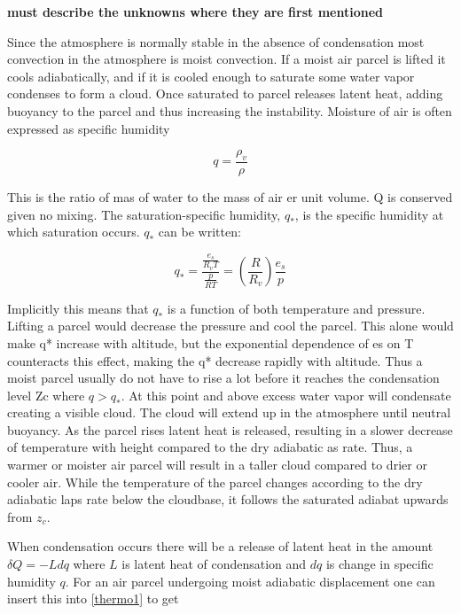 \textbf{must describe the unknowns where they are first mentioned}


Since the atmosphere is normally stable in the absence of condensation most convection in the atmosphere is moist convection. If a moist air parcel is lifted it cools adiabatically, and if it is cooled enough to saturate some water vapor condenses to form a cloud. Once saturated to parcel releases latent heat, adding buoyancy to the parcel and thus increasing the instability.
Moisture of air is often expressed as specific humidity 

\begin{equation}
    q = \frac{\rho_v}{\rho}
\end{equation}

This is the ratio of mas of water to the mass of air er unit volume. Q is conserved given no mixing. The saturation-specific humidity, $q_*$, is the specific humidity at which saturation occurs. $q_*$ can be written:

\begin{equation}
    q_* = \frac{\frac{e_s}{R_v T}}{\frac{p}{RT}} = \left(\frac{R}{R_v}\right)\frac{e_s}{p}
\end{equation}

Implicitly this means that $q_*$ is a function of both temperature and pressure. Lifting a parcel would decrease the pressure and cool the parcel. This alone would make q* increase with altitude, but the exponential dependence of es on T counteracts this effect, making the q* decrease rapidly with altitude. Thus a moist parcel usually do not have to rise a lot before it reaches the condensation level Zc where $q>q_*$. At this point and above excess water vapor will condensate creating a visible cloud. The cloud will extend up in the atmosphere until neutral buoyancy. As the parcel rises latent heat is released, resulting in a slower decrease of temperature with height compared to the dry adiabatic as rate.  Thus, a warmer or moister air parcel will result in a taller cloud compared to drier or cooler air. While the temperature of the parcel changes according to the dry adiabatic laps rate below the cloudbase, it follows the saturated adiabat upwards from $z_c$. 

When condensation occurs there will be a release of latent heat in the amount $\delta Q = -L dq$ where $L$ is latent heat of condensation and $dq$ is change in specific humidity $q$. For an air parcel undergoing moist adiabatic displacement one can insert this into \eqref{thermo1} to get 

